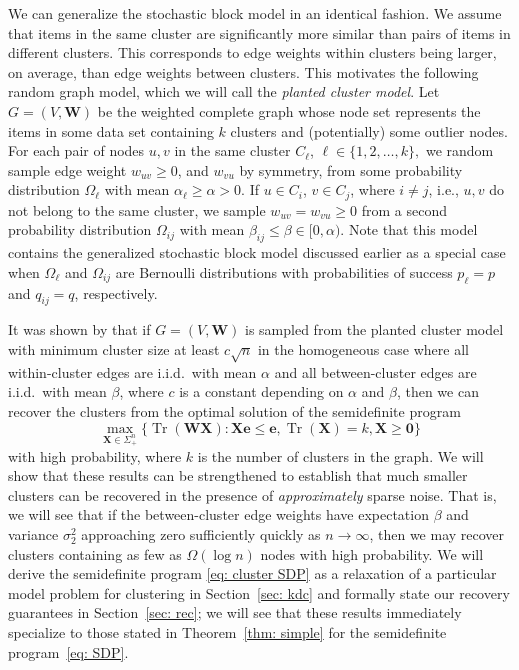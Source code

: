 \documentclass[twoside,11pt]{article}
\DeclareMathOperator{\tr}{{Tr}}
\newcommand{\e}{\bs {e}}
\newcommand{\bs}{\boldsymbol}
\newcommand{\X}{\bs {X}}
\newcommand{\W}{\bs {W}}
\newcommand{\0}{\bs{0}}
\newcommand{\ra}{\rightarrow}
\begin{document}
We can generalize %
the stochastic block model in an identical fashion.
We assume that items in the same cluster are significantly
more similar than pairs of items in different clusters.
This corresponds to edge weights within clusters being larger, on average,
than edge weights between clusters.
This motivates the following random graph model,
which we will call the \emph{planted cluster model}.
Let \(G = (V,\W)\) be the weighted complete graph whose node set
represents the items in some data set containing \(k\) clusters and (potentially)
some outlier nodes.
For each pair of nodes \(u,v \) in the same cluster $C_\ell$,
$\ell \in \{1,2,\dots, k\},$
we random sample
edge weight \(w_{uv} \ge 0\), and \(w_{vu}\) by symmetry,
from some probability distribution \(\Omega_\ell\)
with mean \(\alpha_\ell \ge \alpha > 0\). If \(u \in C_i\),
\(v \in C_j\), where $i \neq j$, i.e., $u,v$ do not belong to the same
cluster, we sample \(w_{uv} = w_{vu} \ge 0\) from a second probability distribution
\(\Omega_{ij}\) with mean \( \beta_{ij} \le \beta \in [0,\alpha) \).
Note that this model contains the generalized stochastic block model discussed
earlier as a special case when \(\Omega_\ell \) and \(\Omega_{ij}\)
are Bernoulli distributions with probabilities of success
\(p_\ell = p\) and \(q_{ij} = q\), respectively.

It was shown by \cite{ames2014guaranteed} that if \(G = (V, \W)\) is sampled
from the
planted cluster model
with minimum cluster
size at least \(c\sqrt{n}\) in the homogeneous
case where all within-cluster edges are i.i.d.~with mean $\alpha$
and all between-cluster edges are i.i.d.~with mean $\beta$, where \(c\) is a constant
depending on \(\alpha\) and \(\beta\), then we can recover the clusters
from the optimal solution of the semidefinite program
\begin{equation} \label{eq: cluster SDP}
\max_{\X \in \Sigma_+^n} \Big\{ \tr(\W \X): \X \e \le \e,
\tr(\X) = k, \X \ge \0 \Big\}
\end{equation}
with high probability, where \(k \) is the number of clusters in the graph.
We will show that these results can be strengthened to establish that much
smaller clusters can be recovered in the presence of \emph{approximately}
sparse noise. That is, we will
see that if the between-cluster edge weights have expectation
\(\beta\) and variance \(\sigma_2^2\) approaching zero  sufficiently quickly as \(n \ra \infty\), then we may recover
clusters containing as few as \(\Omega(\log n)\) nodes with high probability. %
We will derive the semidefinite program \eqref{eq: cluster SDP}
as a relaxation of a particular model problem for clustering in Section~\ref{sec: kdc}
and formally state our recovery guarantees  in Section~\ref{sec: rec};
we will see that these results immediately specialize to those stated in Theorem~\ref{thm: simple}
for the semidefinite program~\eqref{eq: SDP}.
\end{document}
